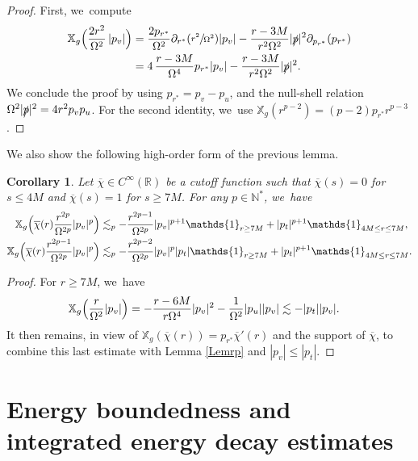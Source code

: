 \documentclass[10pt]{amsart}
\theoremstyle{plain}
\newtheorem{corollary}[proposition]{Corollary}
\theoremstyle{definition}
\newcommand\R{{\mathbb{R}}}
\newcommand\T{{\mathbb{X}}}
\begin{document}
\begin{proof}
First, we~compute
\begin{align*}
\T_g \Bigl(\frac{2r^2}{\Omega^2}\, |p_v| \Bigr) & = \frac{2p_{r^*}}{\Omega^2} \partial_{r^*}(\sfrac{r^2}{\Omega^2}) |p_v| -\frac{r-3M}{r^2 \Omega^2} |\slashed{p}|^2 \partial_{p_{r^*}} (p_{r^*}) \\
&= 4\,\frac{r-3M}{\Omega^4}p_{r^*}|p_v| - \frac{r-3M}{r^2\Omega^2} |\slashed{p}|^2.
\end{align*}
We conclude the proof by using $p_{r^*}=p_v-p_u$, and the null-shell relation $\Omega^2 |\slashed{p}|^2=4r^2p_vp_u$. For the second identity, we~use $\T_g(r^{p-2})=(p-2)p_{r^*}r^{p-3}$.
\end{proof}

\pagebreak[2]
We also show the following high-order form of the previous lemma.

\begin{corollary}\label{Corrp}
Let $\overline{\chi} \in C^\infty (\R)$ be a cutoff function such that $\overline{\chi} (s) =0$ for $s \leq 4M$ and $\overline{\chi} (s) = 1$ for $s \geq 7M$. For any $p \in \mathbb{N}^*$, we~have\vspace*{-3pt}
\begin{align*}
\T_g \Bigl(\overline{\chi}(r) \frac{r^{2p}}{\Omega^{2p}} |p_v|^p \Bigr) & \lesssim_p -\frac{r^{2p-1}}{\Omega^{2p}}|p_v|^{p+1} \mathds{1}_{r \geq 7M}+|p_t|^{p+1} \mathds{1}_{4M \leq r \leq 7M}, \\
\T_g \Bigl(\overline{\chi}(r) \frac{r^{2p-1}}{\Omega^{2p}} |p_v|^p \Bigr) & \lesssim_p -\frac{r^{2p-2}}{\Omega^{2p}}|p_v|^{p}|p_t| \mathds{1}_{r \geq 7M}+|p_t|^{p+1} \mathds{1}_{4M \leq r \leq 7M}.
\end{align*}
\end{corollary}
\begin{proof}
For $r \geq 7M$, we~have\vspace*{-3pt}
\begin{align*}
\T_g \Bigl(\frac{r}{\Omega^2} |p_v| \Bigr) & = -\frac{r-6M}{r\Omega^4}|p_v|^2-\frac{1}{\Omega^2}|p_u ||p_v| \lesssim -|p_t||p_v|.
\end{align*}
It then remains, in view of $\T_g(\overline{\chi}(r))=p_{r^*} \overline{\chi}'(r)$ and the support of $\overline{\chi}$, to combine this last estimate with Lemma \ref{Lemrp} and $|p_v| \leq |p_t|$.
\end{proof}

\section{Energy boundedness and integrated energy decay estimates}\label{Sec4}
\end{document}

